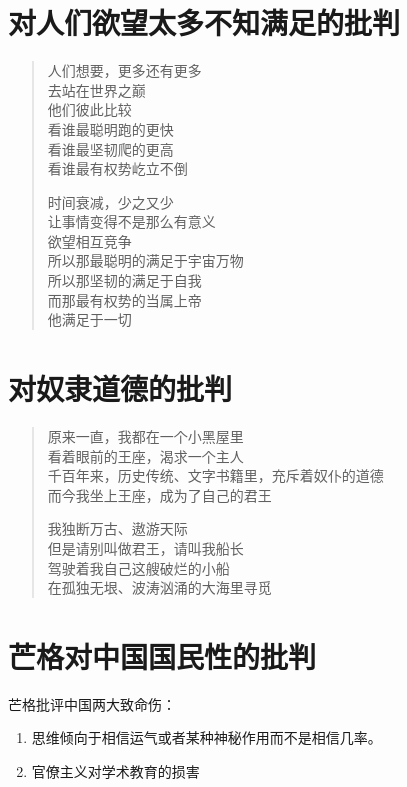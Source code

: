 \documentclass[12pt,oneside]{book}
\newenvironment{shici}{
\begin{verse}
\centering\large\hspace{12pt}}
{\end{verse}}
\begin{document}
\chapter{对人们欲望太多不知满足的批判}
\begin{shici}
人们想要，更多还有更多\\
去站在世界之巅\\
他们彼此比较\\
看谁最聪明跑的更快\\
看谁最坚韧爬的更高\\
看谁最有权势屹立不倒

时间衰减，少之又少\\
让事情变得不是那么有意义\\
欲望相互竞争\\
所以那最聪明的满足于宇宙万物\\
所以那坚韧的满足于自我\\
而那最有权势的当属上帝\\
他满足于一切
\end{shici}



\chapter{对奴隶道德的批判}
\begin{shici}
原来一直，我都在一个小黑屋里\\
看着眼前的王座，渴求一个主人\\
千百年来，历史传统、文字书籍里，充斥着奴仆的道德\\
而今我坐上王座，成为了自己的君王 

我独断万古、遨游天际\\
但是请别叫做君王，请叫我船长\\
驾驶着我自己这艘破烂的小船\\
在孤独无垠、波涛汹涌的大海里寻觅 
\end{shici}

\chapter{芒格对中国国民性的批判}
芒格批评中国两大致命伤：

\begin{enumerate}
\item 思维倾向于相信运气或者某种神秘作用而不是相信几率。
\item 官僚主义对学术教育的损害
\end{enumerate}
\end{document}
